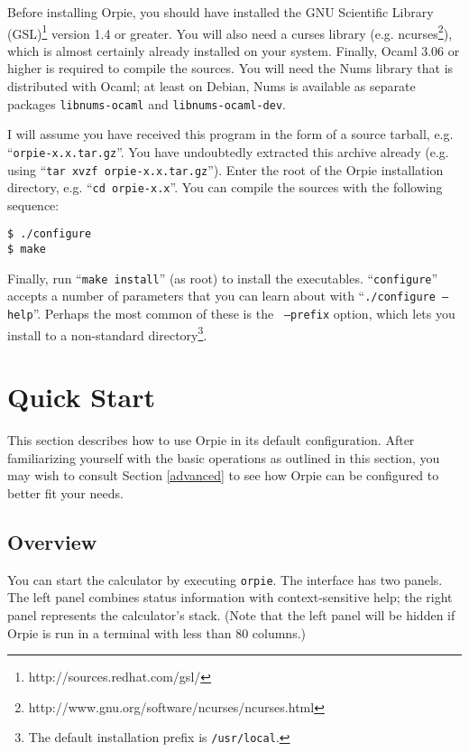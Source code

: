 \documentclass[11pt,notitlepage]{article}
\begin{document}
Before installing Orpie, you should have installed the 
GNU Scientific Library (GSL)\footnote{http://sources.redhat.com/gsl/} 
version 1.4 or greater.  You will also need a curses library (e.g.
ncurses\footnote{http://www.gnu.org/software/ncurses/ncurses.html}), 
which is almost certainly already installed on your system.  Finally, Ocaml
3.06 or higher is required to compile the sources.  You will need the Nums
library that is distributed with Ocaml; at least on Debian, Nums is available
as separate packages {\tt libnums-ocaml} and {\tt libnums-ocaml-dev}.

I will assume you have received this program in the form of a source tarball, 
e.g. ``{\tt orpie-x.x.tar.gz}''.  You have undoubtedly extracted this archive 
already (e.g. using ``{\tt tar xvzf orpie-x.x.tar.gz}'').  Enter the root of 
the Orpie installation directory, e.g. ``{\tt cd orpie-x.x}''.  You can compile
the sources with the following sequence:
\begin{verbatim}
$ ./configure
$ make
\end{verbatim}
Finally, run ``{\tt make install}'' (as root) to install the executables.
``{\tt configure}'' accepts a number of parameters that you can learn about with
``{\tt ./configure --help}''.  Perhaps the most common of these is the {\tt
--prefix} option, which lets you install to a non-standard
directory\footnote{The default installation prefix is {\tt /usr/local}.}.  


\section{Quick Start}
This section describes how to use Orpie in its default configuration.  After
familiarizing yourself with the basic operations as outlined in this section,
you may wish to consult Section \ref{advanced} to see how Orpie can be
configured to better fit your needs.

\subsection{Overview}
You can start the calculator by executing {\tt orpie}.  The interface has two
panels.  The left panel combines status information with context-sensitive help;
the right panel represents the calculator's stack.  (Note that the left panel
will be hidden if Orpie is run in a terminal with less than 80 columns.)
\end{document}
